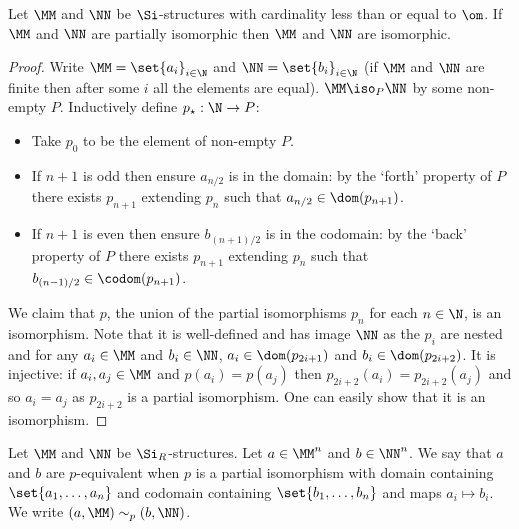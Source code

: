 \begin{prop}
    Let $\MM$ and $\NN$ be $\Si$-structures with
    cardinality less than or equal to $\om$.
    If $\MM$ and $\NN$ are partially isomorphic then 
    $\MM$ and $\NN$ are isomorphic. 
\end{prop}
\begin{proof}
    Write $\MM = \set{a_i}_{i \in \N}$ and $\NN = \set{b_i}_{i \in \N}$
    (if $\MM$ and $\NN$ are finite then after some $i$ all the elements are 
    equal).
    $\MM \iso_P \NN$ by some non-empty $P$.
    Inductively define $p_\star : \N \to P$:
    \begin{itemize}
        \item Take $p_0$ to be the element of non-empty $P$.
        \item If $n + 1$ is odd then ensure $a_{n/2}$ 
            is in the domain:
            by the `forth' property of $P$ there exists $p_{n+1}$ 
            extending $p_n$ such that $a_{n/2} \in \dom(p_{n+1})$.
        \item If $n + 1$ is even then ensure $b_{(n+1)/2}$ is in the codomain:
            by the `back' property of $P$ there exists $p_{n+1}$ 
            extending $p_n$ such that $b_{(n-1)/2} \in \codom(p_{n+1})$.
    \end{itemize}
    We claim that $p$, the union of the partial isomorphisms 
    $p_n$ for each $n \in \N$, is an isomorphism.
    Note that it is well-defined and has image $\NN$ as the $p_i$ are nested and
    for any $a_i \in \MM$ and $b_i \in \NN$, 
    $a_i \in \dom(p_{2i+1})$ and $b_i \in \dom(p_{2i+2})$.
    It is injective: if $a_i, a_j \in \MM$ and $p(a_i) = p(a_j)$ then 
    $p_{2i+2}(a_i) = p_{2i+2}(a_j)$ and so $a_i = a_j$ as $p_{2i+2}$ is a 
    partial isomorphism.
    One can easily show that it is an isomorphism.
\end{proof}

\begin{dfn}%
    Let $\MM$ and $\NN$ be $\Si_R$-structures.
    Let $a \in \MM^{n}$ and $b \in \NN^{n}$.
    We say that $a$ and $b$ are $p$-equivalent when
    $p$ is a partial isomorphism with domain containing
    $\set{a_1,\dots,a_n}$ and codomain containing $\set{b_1,\dots,b_n}$
    and maps $a_i \mapsto b_i$.
    We write $(a, \MM) \sim_p (b, \NN)$.

\end{dfn}

